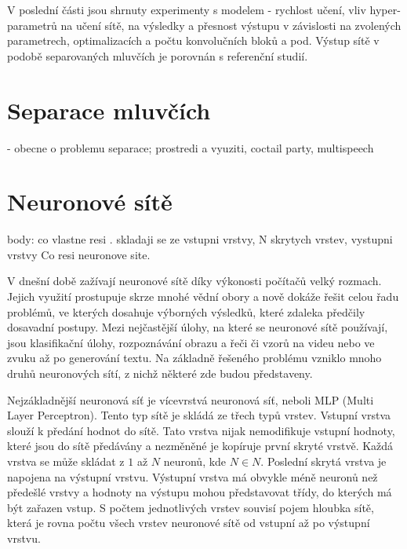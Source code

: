 V poslední části jsou shrnuty experimenty s modelem - rychlost učení, vliv hyper-parametrů na učení sítě, na výsledky a přesnost výstupu v závislosti na zvolených parametrech, optimalizacích a počtu konvolučních bloků a pod. Výstup sítě v podobě separovaných mluvčích je porovnán s referenční studií.


\chapter{Separace mluvčích}
\label{separacemluvcich}
- obecne o problemu separace; prostredi a vyuziti, coctail party, multispeech

\chapter{Neuronové sítě}
\label{neuronovky}
body: co vlastne resi . skladaji se ze vstupni vrstvy, N skrytych vrstev, vystupni vrstvy
Co resi neuronove site.

V dnešní době zažívají neuronové sítě díky výkonosti počítačů velký rozmach. Jejich využití prostupuje skrze mnohé vědní obory a nově dokáže řešit celou řadu problémů, ve kterých dosahuje výborných výsledků, které zdaleka předčily dosavadní postupy. Mezi nejčastější úlohy, na které se neuronové sítě používají, jsou klasifikační úlohy, rozpoznávání obrazu a řeči či vzorů na videu nebo ve zvuku až po generování textu. Na základně řešeného problému vzniklo mnoho druhů neuronových sítí, z nichž některé zde budou představeny.

Nejzákladnější neuronová síť je vícevrstvá neuronová síť, neboli MLP (Multi Layer Perceptron). Tento typ sítě je skládá ze třech typů vrstev. Vstupní vrstva slouží k předání hodnot do sítě. Tato vrstva nijak nemodifikuje vstupní hodnoty, které jsou do sítě předávány a nezměněné je kopíruje první skryté vrstvě. Každá vrstva se může skládat z $1$ až $N$ neuronů, kde $N \in N$. Poslední skrytá vrstva je napojena na výstupní vrstvu. Výstupní vrstva má obvykle méně neuronů než předešlé vrstvy a hodnoty na výstupu mohou představovat třídy, do kterých má být zařazen vstup. S počtem jednotlivých vrstev souvisí pojem hloubka sítě, která je rovna počtu všech vrstev neuronové sítě od vstupní až po výstupní vrstvu.


